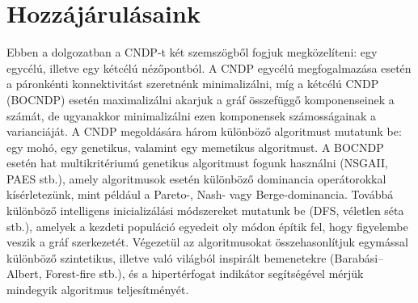 \section{Hozzájárulásaink}\label{sec:HOZZAJARULASAINK}

Ebben a dolgozatban a CNDP-t két szemszögből fogjuk megközelíteni: egy egycélú, illetve egy kétcélú nézőpontból.
A CNDP egycélú megfogalmazása esetén a páronkénti konnektivitást szeretnénk minimalizálni, míg a kétcélú CNDP (BOCNDP) esetén maximalizálni akarjuk a gráf összefüggő komponenseinek a számát, de ugyanakkor minimalizálni ezen komponensek számosságainak a varianciáját.
A CNDP megoldására három különböző algoritmust mutatunk be: egy mohó, egy genetikus, valamint egy memetikus algoritmust.
A BOCNDP esetén hat multikritériumú genetikus algoritmust fogunk használni (NSGAII, PAES stb.), amely algoritmusok esetén különböző dominancia operátorokkal kísérletezünk, mint például a Pareto-, Nash- vagy Berge-dominancia.
Továbbá különböző intelligens inicializálási módszereket mutatunk be (DFS, véletlen séta stb.), amelyek a kezdeti populáció egyedeit oly módon építik fel, hogy figyelembe veszik a gráf szerkezetét.
Végezetül az algoritmusokat összehasonlítjuk egymással különböző szintetikus, illetve való világból inspirált bemenetekre (Barabási–Albert, Forest-fire stb.), és a hipertérfogat indikátor segítségével mérjük mindegyik algoritmus teljesítményét.
